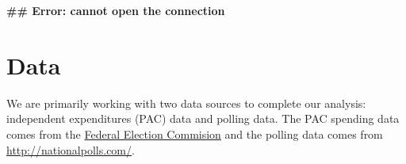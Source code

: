\documentclass[11pt]{article}\usepackage{graphicx, color}
\makeatletter
\newenvironment{kframe}{%
 \def\at@end@of@kframe{}%
 \ifinner\ifhmode%
  \def\at@end@of@kframe{\end{minipage}}%
  \begin{minipage}{\columnwidth}%
 \fi\fi%
 \def\FrameCommand##1{\hskip\@totalleftmargin \hskip-\fboxsep
 \colorbox{shadecolor}{##1}\hskip-\fboxsep
     \hskip-\linewidth \hskip-\@totalleftmargin \hskip\columnwidth}%
 \MakeFramed {\advance\hsize-\width
   \@totalleftmargin\z@ \linewidth\hsize
   \@setminipage}}%
 {\par\unskip\endMakeFramed%
 \at@end@of@kframe}
\newenvironment{knitrout}{}{} %
\makeatother
\begin{document}
\begin{knitrout}
\color{fgcolor}\begin{kframe}


{\ttfamily\noindent\bfseries\textcolor{errorcolor}{\#\# Error: cannot open the connection}}\end{kframe}
\end{knitrout}




\section{Data}
We are primarily working with two data sources to complete our analysis: independent expenditures (PAC) data and polling data. The PAC spending data comes from the \href{http://www.fec.gov/data/IndependentExpenditure.do?format=html&cf=superPAC}{Federal Election Commision} and the polling data comes from \url{http://nationalpolls.com/}. 
\end{document}
